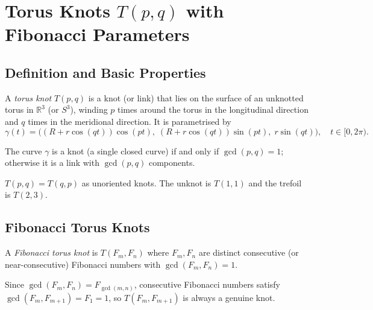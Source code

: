\section{Torus Knots \texorpdfstring{$T(p,q)$}{T(p,q)} with Fibonacci
  Parameters}
\label{sec:ch18-knots}

\subsection{Definition and Basic Properties}\label{subsec:ch18-knot-def}

\begin{definition}\label{def:torus-knot}
A \emph{torus knot} $T(p,q)$ is a knot (or link) that lies on the surface of an
unknotted torus in $\mathbb{R}^3$ (or $S^3$), winding $p$ times around the torus
in the longitudinal direction and $q$ times in the meridional direction.
It is parametrised by
\begin{equation}\label{eq:torus-knot-param}
  \gamma(t) = \bigl((R + r\cos(qt))\cos(pt),\;
                    (R + r\cos(qt))\sin(pt),\;
                    r\sin(qt)\bigr), \quad t \in [0,2\pi).
\end{equation}
\end{definition}

The curve $\gamma$ is a knot (a single closed curve) if and only if
$\gcd(p,q) = 1$; otherwise it is a link with $\gcd(p,q)$ components.

\begin{proposition}
$T(p,q) = T(q,p)$ as unoriented knots.
The unknot is $T(1,1)$ and the trefoil is $T(2,3)$.
\end{proposition}

\subsection{Fibonacci Torus Knots}\label{subsec:ch18-fibonacci-knots}

\begin{definition}\label{def:fib-knot}
A \emph{Fibonacci torus knot} is $T(F_m, F_n)$ where $F_m, F_n$ are distinct
consecutive (or near-consecutive) Fibonacci numbers with $\gcd(F_m, F_n) = 1$.
\end{definition}

Since $\gcd(F_m, F_n) = F_{\gcd(m,n)}$, consecutive Fibonacci numbers satisfy
$\gcd(F_m, F_{m+1}) = F_1 = 1$, so $T(F_m, F_{m+1})$ is always a genuine knot.

